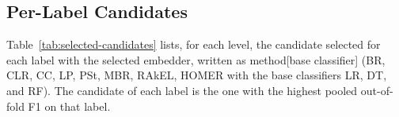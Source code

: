 \documentclass{Configuration_Files/PoliMi3i_thesis}
\begin{document}
\begin{table}
    \centering
    \caption{\textbf{Composed out-of-fold macro F1 of each embedder} at each categorization level (selection scores on the training partition).}
    \label{tab:oof-embedders}
    \footnotesize
\end{table}

\subsection{Per-Label Candidates}
Table~\ref{tab:selected-candidates} lists, for each level, the candidate selected for each label with the selected embedder, written as method[base classifier] (BR, CLR, CC, LP, PSt, MBR, RAkEL, HOMER with the base classifiers LR, DT, and RF). The candidate of each label is the one with the highest pooled out-of-fold F1 on that label.
\end{document}
